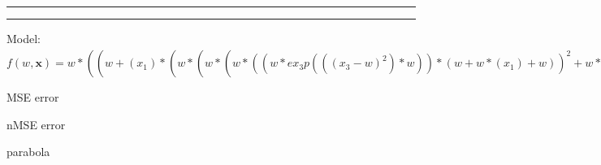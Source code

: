 \documentclass[12pt]{article}
\begin{document}
\hrule
\vspace{1cm}
\hrule
\vspace{1cm}
Model: $f(w,\mathbf{x})=w*((w+(x_1)*(w*(w*(w*((w*ex_3p(((x_3-w)^2)*w))*(w+w*(x_1)+w))^2+w*((w*ex_3p(((x_3-w)^2)*w))*(w+w*(x_1)+w))+w)))+w*(x_3))*(w*(w*((w*ex_3p(((x_3-w)^2)*w))*(w+w*(x_1)+w))^2+w*((w*ex_3p(((x_3-w)^2)*w))*(w+w*(x_1)+w))+w)))^2+w*((w+(x_1)*(w*(w*(w*((w*ex_3p(((x_3-w)^2)*w))*(w+w*(x_1)+w))^2+w*((w*ex_3p(((x_3-w)^2)*w))*(w+w*(x_1)+w))+w)))+w*(x_3))*(w*(w*((w*ex_3p(((x_3-w)^2)*w))*(w+w*(x_1)+w))^2+w*((w*ex_3p(((x_3-w)^2)*w))*(w+w*(x_1)+w))+w)))+w$

MSE error

nMSE error


\begin{bundle}{parabola}\end{bundle}
\end{document}
